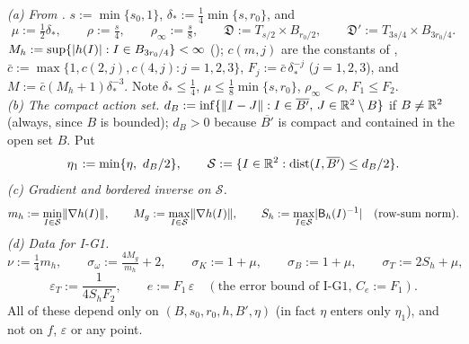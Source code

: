 \begin{definition}\label{bpI:p3:constants}
\emph{(a) From .} $s:=\min\{s_0,1\}$, $\delta_*:=\tfrac14\min\{s,r_0\}$, and
\[
\mu:=\tfrac12\delta_*,\qquad \rho:=\tfrac s4,\qquad\rho_\infty:=\tfrac s8,\qquad
\mathfrak D:=T_{s/2}\times B_{r_0/2},\qquad \mathfrak D':=T_{3s/4}\times B_{3r_0/4}.
\]
$M_h:=\sup\{\lvert h(I)\rvert:I\in B_{3r_0/4}\}<\infty$ (); $c(m,j)$ are the constants of ,
$\bar c:=\max\{1,c(2,j),c(4,j):j=1,2,3\}$, $F_j:=\bar c\,\delta_*^{-j}$ ($j=1,2,3$), and
$M:=\bar c(M_h+1)\delta_*^{-3}$. Note $\delta_*\le\tfrac14$, $\mu\le\tfrac18\min\{s,r_0\}$, $\rho_\infty<\rho$, $F_1\le F_2$.\\
\emph{(b) The compact action set.} $d_B:=\inf\{\lVert I-J\rVert:I\in\overline{B'},\,J\in\mathbb{R}^2\setminus B\}$ if $B\ne\mathbb{R}^2$ (always, since $B$ is bounded);
$d_B>0$ because $\overline{B'}$ is compact and contained in the open set $B$. Put
\[
\eta_1:=\min\{\eta,\ d_B/2\},\qquad \mathcal S:=\{I\in\mathbb{R}^2:\operatorname{dist}(I,\overline{B'})\le d_B/2\}.
\]
\emph{(c) Gradient and bordered inverse on $\mathcal S$.}
\[
m_h:=\min_{I\in\mathcal S}\lVert \nabla h(I)\rVert,\qquad M_g:=\max_{I\in\mathcal S}\lVert \nabla h(I)\rVert,\qquad
S_h:=\max_{I\in\mathcal S}\lvert \mathsf B_h(I)^{-1}\rvert\quad(\text{row-sum norm}).
\]
\emph{(d) Data for I-G1.}
\[
\nu:=\tfrac14m_h,\qquad\sigma_\omega:=\tfrac{4M_g}{m_h}+2,\qquad\sigma_K:=1+\mu,\qquad\sigma_B:=1+\mu,\qquad\sigma_T:=2S_h+\mu,
\]
\[
\varepsilon_T:=\frac1{4S_hF_2},\qquad e:=F_1\,\varepsilon\quad(\text{the error bound of I-G1, }C_e:=F_1).
\]
All of these depend only on $(B,s_0,r_0,h,B',\eta)$ (in fact $\eta$ enters only $\eta_1$), and not on $f$, $\varepsilon$ or any point.
\end{definition}

